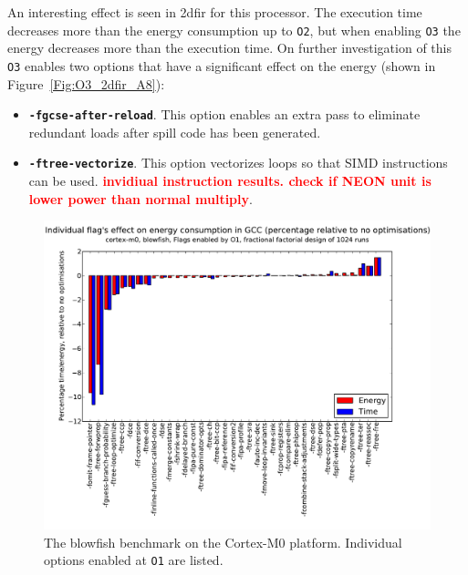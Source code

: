 \documentclass[twocolumn]{article}
\newcommand{\todo}[1]{\textbf{\textcolor{red}{#1}}}
\let\oldcaption\caption
\renewcommand{\caption}[1]{\oldcaption{\textup{#1}}}
\begin{document}
An interesting effect is seen in 2dfir for this processor. The execution time decreases more than the energy consumption up to \texttt{O2}, but when enabling \texttt{O3} the energy decreases more than the execution time. On further investigation of this \texttt{O3} enables two options that have a significant effect on the energy (shown in Figure~\ref{Fig:O3_2dfir_A8}):
\begin{itemize}
	\item \texttt{\bfseries -fgcse-after-reload}. This option enables an extra pass to eliminate redundant loads after spill code has been generated.
	\item \texttt{\bfseries -ftree-vectorize}. This option vectorizes loops so that SIMD instructions can be used. \todo{invidiual instruction results. check if NEON unit is lower power than normal multiply}.
\end{itemize}



\begin{figure}[t]
	\includegraphics[width=\linewidth,clip,trim=0.5cm 0 2cm 1.8cm]{cortex-m0/O1_main_effects_blowfish.pdf}
	\caption{The blowfish benchmark on the Cortex-M0 platform. Individual options enabled at \texttt{O1} are listed.}
	\label{Fig:BlowfishMainEffects}
\end{figure}
\end{document}
